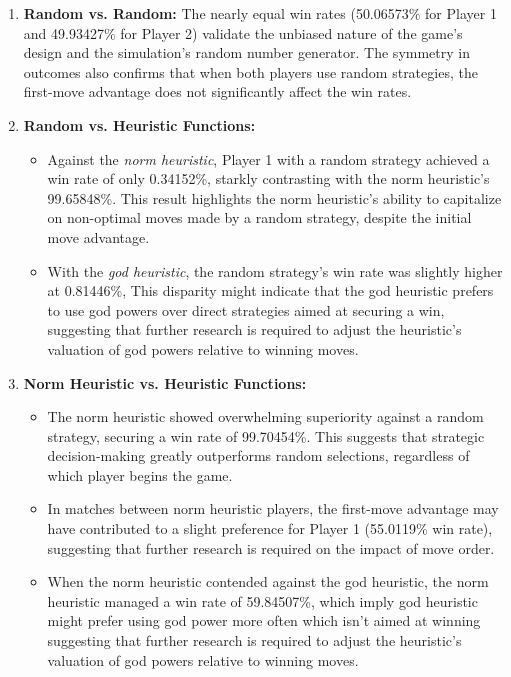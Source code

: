 \documentclass{telkomnika}
\begin{document}
\begin{enumerate}
    \item \textbf{Random vs. Random:} The nearly equal win rates (50.06573\% for Player 1 and 49.93427\% for Player 2) validate the unbiased nature of the game's design and the simulation's random number generator. The symmetry in outcomes also confirms that when both players use random strategies, the first-move advantage does not significantly affect the win rates.
    
    \item \textbf{Random vs. Heuristic Functions:}
    \begin{itemize}
        \item Against the \textit{norm heuristic}, Player 1 with a random strategy achieved a win rate of only 0.34152\%, starkly contrasting with the norm heuristic's 99.65848\%. This result highlights the norm heuristic’s ability to capitalize on non-optimal moves made by a random strategy, despite the initial move advantage.
        \item With the \textit{god heuristic}, the random strategy's win rate was slightly higher at 0.81446\%, This disparity might indicate that the god heuristic prefers to use god powers over direct strategies aimed at securing a win, suggesting that further research is required to adjust the heuristic's valuation of god powers relative to winning moves.
    \end{itemize}

    \item \textbf{Norm Heuristic vs. Heuristic Functions:}
    \begin{itemize}
        \item The norm heuristic showed overwhelming superiority against a random strategy, securing a win rate of 99.70454\%. This suggests that strategic decision-making greatly outperforms random selections, regardless of which player begins the game.
        \item In matches between norm heuristic players, the first-move advantage may have contributed to a slight preference for Player 1 (55.0119\% win rate), suggesting that further research is required on the impact of move order.
        \item When the norm heuristic contended against the god heuristic, the norm heuristic managed a win rate of 59.84507\%, which imply god heuristic might prefer using god power more often which isn't aimed at winning suggesting that further research is required to adjust the heuristic's valuation of god powers relative to winning moves.
    \end{itemize}
    

\end{enumerate}
\end{document}
